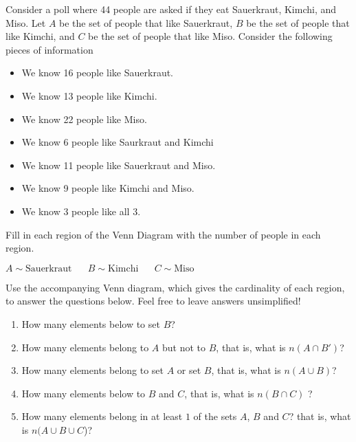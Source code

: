 \documentclass[addpoints,12pt]{exam}
\begin{document}
\begin{questions}
\question Consider a poll where 44 people are asked if they eat Sauerkraut, Kimchi, and Miso. Let $A$ be the set of people that like Sauerkraut, $B$ be the set of people that like Kimchi, and $C$ be the set of people that like Miso. Consider the following pieces of information
\begin{itemize}
	\item We know 16 people like Sauerkraut. 
	\item We know 13 people like Kimchi. 
	\item We know 22 people like Miso.
	\item We know 6 people like Saurkraut and Kimchi
	\item We know 11 people like Sauerkraut and Miso. 
	\item We know 9 people like Kimchi and Miso. 
	\item We know 3 people like all 3. 
\end{itemize}

Fill in each region of the Venn Diagram with the number of people in each region. 

\begin{center}
$A\sim \text{Sauerkraut} \hspace{20pt} B \sim \text{Kimchi}\hspace{20pt} C \sim \text{Miso}$ 

\vspace{10pt}

\end{center}

\newpage

\question Use the accompanying Venn diagram, which gives the cardinality of each region, to answer the questions below. Feel free to leave answers unsimplified! 

\begin{enumerate}[label = \alph*)]
    \item How many elements below to set $B$? 
		\item How many elements belong to $A$ but not to $B$, that is, what is $n(A\cap B ')$?
		\item How many elements belong to set $A$ or set $B$,  that is, what is $n(A\cup B)$? 
		\item How many elements below to $B$ and $C$, that is, what is $n(B\cap C)$ ?
		\item How many elements belong in at least $1$ of the sets $A$, $B$ and $C$? that is, what is $n(A\cup B\cup C$)?


\end{enumerate}
\end{questions}
\end{document}
